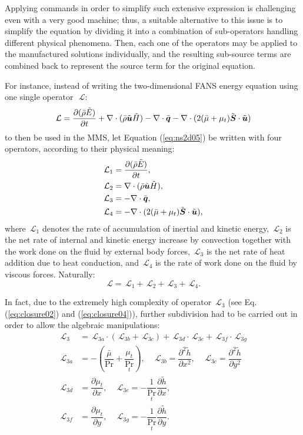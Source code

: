 \documentclass[10pt]{article}
\newcommand{\Diff}[2] {\dfrac{\partial( #1)}{\partial #2}}
\newcommand{\diff}[2] {\dfrac{\partial #1}{\partial #2}}
\newcommand{\bv}[1]{\ensuremath{\mbox{\boldmath$ #1 $}}}
\newcommand{\Lo}{\,\mathcal{L}}
\newcommand{\bmu}{\bar{\mu}}
\newcommand{\hh}{\tilde{h}}
\begin{document}
Applying commands in order to simplify such extensive expression is challenging even with a very good machine; thus, a suitable alternative to this issue is to simplify the equation by dividing it into a combination of sub-operators handling different physical phenomena. Then, each one of the operators may be applied to the manufactured solutions individually, and the resulting sub-source terms are combined back to represent the source term for the original equation.



For instance, instead of writing the two-dimensional FANS energy equation using one single operator~$\Lo$:
 \begin{equation} \label{eq:ns2d05}
\Lo= \Diff{\bar{\rho} \tilde{E}}{t}+ \nabla \cdot (\bar{\rho} \tilde{\bv{u}} \tilde{H})-\nabla \cdot \bar{\bv{q}} - \nabla\cdot(2 (\bmu+\mu_t) \tilde{\bv{S}} \cdot \tilde{\bv{u}})
\end{equation}
to then be used in the MMS, let Equation (\ref{eq:ns2d05}) be written with four operators, according to their physical meaning:
\begin{equation}
 \begin{split}\label{sub01}
  \Lo_1&=\Diff{\bar{\rho} \tilde{E}}{t},\\
  \Lo_2&=\nabla \cdot (\bar{\rho} \tilde{\bv{u}} \tilde{H}),\\
  \Lo_3&=-\nabla \cdot \bar{\bv{q}},\\
  \Lo_4&=-\nabla\cdot(2 (\bmu+\mu_t) \tilde{\bv{S}} \cdot \tilde{\bv{u}}),
 \end{split}
\end{equation}
where $\Lo_1$ denotes the rate of accumulation of inertial and kinetic energy, $\Lo_2$ is the net rate of internal and kinetic energy increase by convection together with the work done on the fluid by external body forces, $\Lo_3$ is the net rate of heat addition due to heat conduction, and $\Lo_4$ is the rate of work done on the fluid by viscous forces. Naturally:
$$\Lo=\Lo_1+\Lo_2+\Lo_3+\Lo_4.$$


In fact, due to the extremely high complexity of operator $\Lo_3$ (see Eq. (\ref{eq:closure02}) and (\ref{eq:closure04})), further subdivision had to be carried out in order to allow the algebraic manipulations:
\begin{equation}
 \begin{split}\label{sub02}
 \Lo_3&=\Lo_{3a}\cdot(\Lo_{3b}+\Lo_{3c})+\Lo_{3d}\cdot\Lo_{3e}+\Lo_{3f}\cdot\Lo_{3g}\\
 \Lo_{3a} &= -\left(\dfrac{\bmu}{\Pr}+\dfrac{\mu_t}{\Pr_t}\right),\quad \Lo_{3b} = \diff{^2\hh}{ x^2},\quad \Lo_{3c} = \diff{^2\hh}{ y^2}\\
 \Lo_{3d} &= \diff{\mu_t}{ x},\quad \Lo_{3e} = -\dfrac{1}{\Pr_t} \diff{\hh}{ x},\\
 \Lo_{3f} &= \diff{\mu_t}{ y},\quad \Lo_{3g} = -\dfrac{1}{\Pr_t} \diff{\hh}{ y}.\\
 \end{split}
\end{equation}
\end{document}
